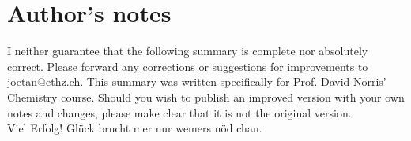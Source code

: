 \section{Author's notes}
I neither guarantee that the following summary is complete nor absolutely correct. Please forward any corrections or suggestions for improvements to joetan@ethz.ch. This summary was written specifically for Prof. David Norris' Chemistry course.
Should you wish to publish an improved version with your own notes and changes, please make clear that it is not the original version. 
\\
Viel Erfolg! Glück brucht mer nur wemers nöd chan. 